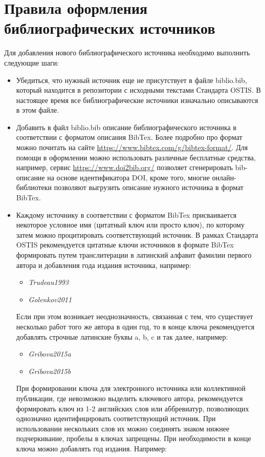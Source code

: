 \section*{Правила оформления библиографических источников}

Для добавления нового библиографического источника необходимо выполнить следующие шаги:
\begin{itemize}
	\item Убедиться, что нужный источник еще не присутствует в файле biblio.bib, который находится в репозитории с исходными текстами Стандарта OSTIS. В настоящее время все библиографические источники изначально описываются в этом файле.
	\item Добавить в файл biblio.bib описание библиографического источника в соответствии с форматом описания BibTex. Более подробно про формат можно почитать на сайте \url{https://www.bibtex.com/g/bibtex-format/}. Для помощи в оформлении можно использовать различные бесплатные средства, например, сервис \url{https://www.doi2bib.org/} позволяет сгенерировать bib-описание на основе идентификатора DOI, кроме того, многие онлайн-библиотеки позволяют выгрузить описание нужного источника в формат BibTex.
	\item Каждому источнику в соответствии с форматом BibTex присваивается некоторое условное имя (цитатный ключ или просто ключ), по которому затем можно процитировать соответствующий источник. В рамках Стандарта OSTIS рекомендуется цитатные ключи источников в формате BibTex формировать путем транслитерации в латинский алфавит фамилии первого автора и добавления года издания источника, например:
	
	\begin{itemize}
		\item \textit{Trudeau1993}
		\item \textit{Golenkov2011}
	\end{itemize}
	
	Если при этом возникает неоднозначность, связанная с тем, что существует несколько работ того же автора в один год, то в конце ключа рекомендуется добавлять строчные латинские буквы a, b, c и так далее, например:
	
	\begin{itemize}
		\item \textit{Gribova2015a}
		\item \textit{Gribova2015b}
	\end{itemize}
	
	При формировании ключа для электронного источника или коллективной публикации, где невозможно выделить ключевого автора, рекомендуется формировать ключ из 1-2 английских слов или аббревиатур, позволяющих однозначно идентифицировать соответствующий источник. При использовании нескольких слов их можно соединять знаком нижнее подчеркивание, пробелы в ключах запрещены. При необходимости в конце ключа можно добавлять год издания. Например:
	

\end{itemize}
